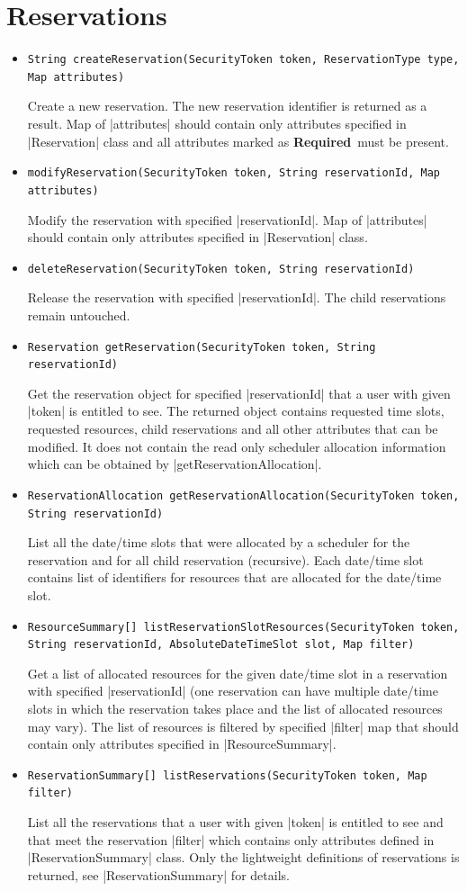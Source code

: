 \documentclass[a4paper]{report}
\newenvironment{Api}{\begin{itemize}}{\end{itemize}}
\newcommand{\ApiCode}[1]{\lstinline[style=styleApi]|#1|}
\newcommand{\ApiItem}[1]{\item #1 %

}
\newcommand{\ApiCmd}[1]{\ApiItem{\ApiCode{#1}}}
\newcommand{\ApiRequired}{{\color{blue!50!black}\textbf{Required}}}
\begin{document}
\section{Reservations}

\begin{Api}

\ApiCmd{String createReservation(SecurityToken token, ReservationType type, Map attributes)}
Create a new reservation. The new reservation identifier is returned as a result. Map of |attributes| should contain only attributes specified in |Reservation| class and all attributes marked as \ApiRequired\ must be present.

\ApiCmd{modifyReservation(SecurityToken token, String reservationId, Map attributes)}
Modify the reservation with specified |reservationId|. Map of |attributes| should contain only attributes specified in |Reservation| class.

\ApiCmd{deleteReservation(SecurityToken token, String reservationId)}
Release the reservation with specified |reservationId|. The child reservations remain untouched.

\ApiCmd{Reservation getReservation(SecurityToken token, String reservationId)}
Get the reservation object for specified |reservationId| that a user with given |token| is entitled to see. The returned object contains requested time slots, requested resources, child reservations and all other attributes that can be modified. It does not contain the read only scheduler allocation information which can be obtained by |getReservationAllocation|.

\ApiCmd{ReservationAllocation getReservationAllocation(SecurityToken token, String reservationId)}
List all the date/time slots that were allocated by a scheduler for the reservation and for all child reservation (recursive). Each date/time slot contains list of identifiers for resources that are allocated for the date/time slot.

\ApiCmd{ResourceSummary[] listReservationSlotResources(SecurityToken token, String reservationId, AbsoluteDateTimeSlot slot, Map filter)}
Get a list of allocated resources for the given date/time slot in a reservation with specified |reservationId| (one reservation can have multiple date/time slots in which the reservation takes place and the list of allocated resources may vary). The list of resources is filtered by specified |filter| map that should contain only attributes specified in |ResourceSummary|.

\ApiCmd{ReservationSummary[] listReservations(SecurityToken token, Map filter)}
List all the reservations that a user with given |token| is entitled to see and that meet the reservation |filter| which contains only attributes defined in |ReservationSummary| class. Only the lightweight definitions of reservations is returned, see |ReservationSummary| for details.


\end{Api}
\end{document}
